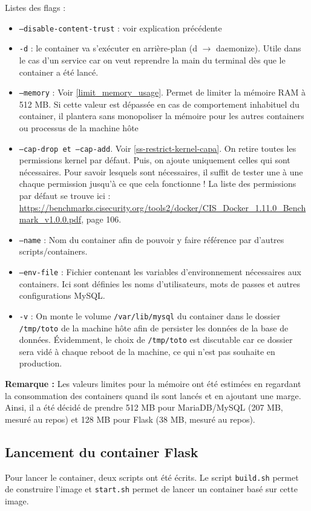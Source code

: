 \documentclass[11pt,a4paper,oneside]{report}
\newcommand{\code}[1]{\texttt{#1}}
\begin{document}
Listes des flags :
\begin{itemize}
\item \code{--disable-content-trust} : voir explication précédente
\item \code{-d} : le container va s'exécuter en arrière-plan (d $ \to $ daemonize). Utile dans le cas d'un service car on veut reprendre la main du terminal dès que le container a été lancé.
\item \code{--memory} : Voir \ref{limit_memory_usage}. Permet de limiter la mémoire RAM à 512 MB. Si cette valeur est dépassée en cas de comportement inhabituel du container, il plantera sans monopoliser la mémoire pour les autres containers ou processus de la machine hôte
\item \code{--cap-drop et --cap-add}. Voir \ref{ss-restrict-kernel-capa}. On retire toutes les permissions kernel par défaut. Puis, on ajoute uniquement celles qui sont nécessaires. Pour savoir lesquels sont nécessaires, il suffit de tester une à une chaque permission jusqu'à ce que cela fonctionne ! La liste des permissions par défaut se trouve ici : \url{https://benchmarks.cisecurity.org/tools2/docker/CIS_Docker_1.11.0_Benchmark_v1.0.0.pdf}, page 106.
\item \code{--name} : Nom du container afin de pouvoir y faire référence par d'autres scripts/containers.
\item \code{--env-file} : Fichier contenant les variables d'environnement nécessaires aux containers. Ici sont définies les noms d'utilisateurs, mots de passes et autres configurations MySQL.
\item \code{-v} : On monte le volume \code{/var/lib/mysql} du container dans le dossier \code{/tmp/toto} de la machine hôte afin de persister les données de la base de données. Évidemment, le choix de \code{/tmp/toto} est discutable car ce dossier sera vidé à chaque reboot de la machine, ce qui n'est pas souhaite en production.
\end{itemize}

\textbf{Remarque :} Les valeurs limites pour la mémoire ont été estimées en regardant la consommation des containers quand ils sont lancés et en ajoutant une marge. Ainsi, il a été décidé de prendre 512 MB pour MariaDB/MySQL (207 MB, mesuré au repos) et 128 MB pour Flask (38 MB, mesuré au repos).


\subsection{Lancement du container Flask}
Pour lancer le container, deux scripts ont été écrits. Le script \code{build.sh} permet de construire l'image et \code{start.sh} permet de lancer un container basé sur cette image.
\end{document}
